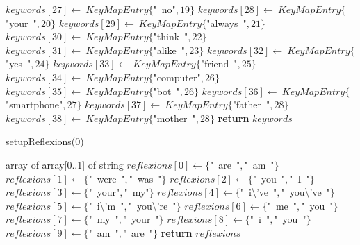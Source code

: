 \documentclass[a4paper,10pt]{article}
\begin{document}
\begin{algorithm}
\begin{algorithmic}[5]
  \State \(keywords[27]\gets\ KeyMapEntry\{\)"{}\ no"{}\(,19\}\)
  \State \(keywords[28]\gets\ KeyMapEntry\{\)"{}your\ "{}\(,20\}\)
  \State \(keywords[29]\gets\ KeyMapEntry\{\)"{}always\ "{}\(,21\}\)
  \State \(keywords[30]\gets\ KeyMapEntry\{\)"{}think\ "{}\(,22\}\)
  \State \(keywords[31]\gets\ KeyMapEntry\{\)"{}alike\ "{}\(,23\}\)
  \State \(keywords[32]\gets\ KeyMapEntry\{\)"{}yes\ "{}\(,24\}\)
  \State \(keywords[33]\gets\ KeyMapEntry\{\)"{}friend\ "{}\(,25\}\)
  \State \(keywords[34]\gets\ KeyMapEntry\{\)"{}computer"{}\(,26\}\)
  \State \(keywords[35]\gets\ KeyMapEntry\{\)"{}bot\ "{}\(,26\}\)
  \State \(keywords[36]\gets\ KeyMapEntry\{\)"{}smartphone"{}\(,27\}\)
  \State \(keywords[37]\gets\ KeyMapEntry\{\)"{}father\ "{}\(,28\}\)
  \State \(keywords[38]\gets\ KeyMapEntry\{\)"{}mother\ "{}\(,28\}\)
  \State \textbf{return} \(keywords\)
\EndFunction
\end{algorithmic}
\end{algorithm}


\begin{algorithm}
\caption{setupReflexions(0)}
\begin{algorithmic}[5]
\State {}
    \State array of array[0..1] of string
  \EndDecl
  \State \(reflexions[0]\gets\{\)"{}\ are\ "{}\(,\)"{}\ am\ "{}\(\}\)
  \State \(reflexions[1]\gets\{\)"{}\ were\ "{}\(,\)"{}\ was\ "{}\(\}\)
  \State \(reflexions[2]\gets\{\)"{}\ you\ "{}\(,\)"{}\ I\ "{}\(\}\)
  \State \(reflexions[3]\gets\{\)"{}\ your"{}\(,\)"{}\ my"{}\(\}\)
  \State \(reflexions[4]\gets\{\)"{}\ i\textbackslash{}'{}ve\ "{}\(,\)"{}\ you\textbackslash{}'{}ve\ "{}\(\}\)
  \State \(reflexions[5]\gets\{\)"{}\ i\textbackslash{}'{}m\ "{}\(,\)"{}\ you\textbackslash{}'{}re\ "{}\(\}\)
  \State \(reflexions[6]\gets\{\)"{}\ me\ "{}\(,\)"{}\ you\ "{}\(\}\)
  \State \(reflexions[7]\gets\{\)"{}\ my\ "{}\(,\)"{}\ your\ "{}\(\}\)
  \State \(reflexions[8]\gets\{\)"{}\ i\ "{}\(,\)"{}\ you\ "{}\(\}\)
  \State \(reflexions[9]\gets\{\)"{}\ am\ "{}\(,\)"{}\ are\ "{}\(\}\)
  \State \textbf{return} \(reflexions\)
\EndFunction
\end{algorithmic}
\end{algorithm}
\end{document}
